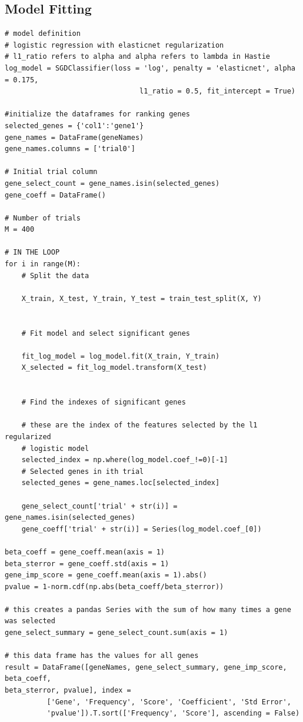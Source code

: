 \documentclass[12pt,a4paper]{article}
\begin{document}
\subsection{Model Fitting}
\begin{verbatim}
# model definition
# logistic regression with elasticnet regularization
# l1_ratio refers to alpha and alpha refers to lambda in Hastie
log_model = SGDClassifier(loss = 'log', penalty = 'elasticnet', alpha = 0.175, 
                                l1_ratio = 0.5, fit_intercept = True)
                                
#initialize the dataframes for ranking genes
selected_genes = {'col1':'gene1'}
gene_names = DataFrame(geneNames)
gene_names.columns = ['trial0']

# Initial trial column 
gene_select_count = gene_names.isin(selected_genes)
gene_coeff = DataFrame()

# Number of trials
M = 400

# IN THE LOOP
for i in range(M):
    # Split the data

    X_train, X_test, Y_train, Y_test = train_test_split(X, Y)


    # Fit model and select significant genes

    fit_log_model = log_model.fit(X_train, Y_train)
    X_selected = fit_log_model.transform(X_test)


    # Find the indexes of significant genes

    # these are the index of the features selected by the l1 regularized 
    # logistic model
    selected_index = np.where(log_model.coef_!=0)[-1]
    # Selected genes in ith trial
    selected_genes = gene_names.loc[selected_index]

    gene_select_count['trial' + str(i)] = gene_names.isin(selected_genes)
    gene_coeff['trial' + str(i)] = Series(log_model.coef_[0])
 
beta_coeff = gene_coeff.mean(axis = 1)
beta_sterror = gene_coeff.std(axis = 1)
gene_imp_score = gene_coeff.mean(axis = 1).abs()
pvalue = 1-norm.cdf(np.abs(beta_coeff/beta_sterror))

# this creates a pandas Series with the sum of how many times a gene was selected
gene_select_summary = gene_select_count.sum(axis = 1)

# this data frame has the values for all genes
result = DataFrame([geneNames, gene_select_summary, gene_imp_score, beta_coeff, 
beta_sterror, pvalue], index = 
          ['Gene', 'Frequency', 'Score', 'Coefficient', 'Std Error',            
          'pvalue']).T.sort(['Frequency', 'Score'], ascending = False)
          

\end{verbatim}
\end{document}

